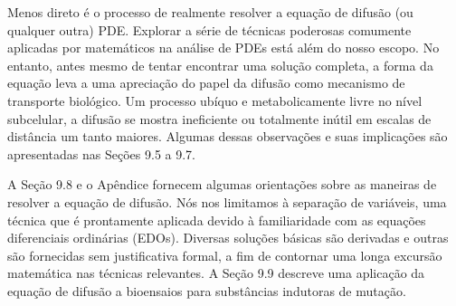 {{Menos direto é o processo de realmente resolver a equação de difusão (ou qualquer outra) PDE. Explorar a série de técnicas poderosas comumente aplicadas por matemáticos na análise de PDEs está além do nosso escopo. No entanto, antes mesmo de tentar encontrar uma solução completa, a forma da equação leva a uma apreciação do papel da difusão como mecanismo de transporte biológico. Um processo ubíquo e metabolicamente livre no nível subcelular, a difusão se mostra ineficiente ou totalmente inútil em escalas de distância um tanto maiores. Algumas dessas observações e suas implicações são apresentadas nas Seções 9.5 a 9.7.}}

{{A Seção 9.8 e o Apêndice fornecem algumas orientações sobre as maneiras de resolver a equação de difusão. Nós nos limitamos à separação de variáveis, uma técnica que é prontamente aplicada devido à familiaridade com as equações diferenciais ordinárias (EDOs). Diversas soluções básicas são derivadas e outras são fornecidas sem justificativa formal, a fim de contornar uma longa excursão matemática nas técnicas relevantes. A Seção 9.9 descreve uma aplicação da equação de difusão a bioensaios para substâncias indutoras de mutação.}}

